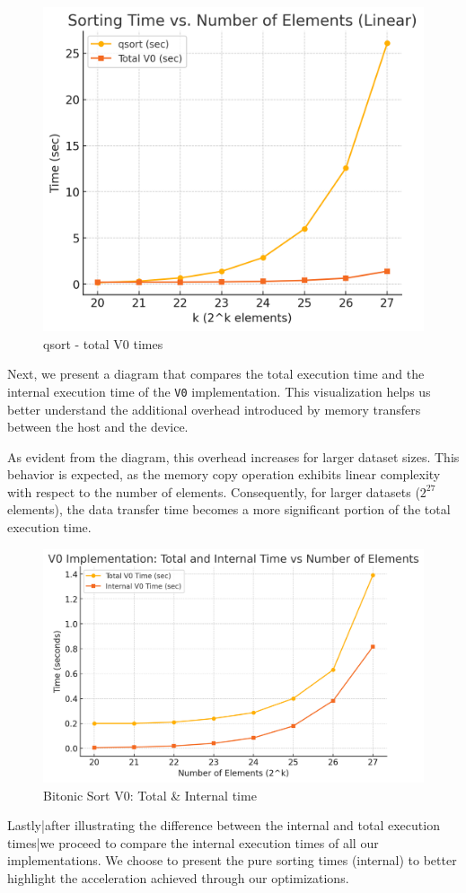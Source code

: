 \documentclass[12pt]{article}
\begin{document}
\begin{figure}[!h]
    \centering
    \includegraphics[width=0.5\linewidth]{plots/plot1_qsort_v0_times.png}
    \caption{qsort - total V0 times}
\end{figure}


Next, we present a diagram that compares the total execution time and the internal execution time of the \texttt{V0} implementation. This visualization helps us better understand the additional overhead introduced by memory transfers between the host and the device.

As evident from the diagram, this overhead increases for larger dataset sizes. This behavior is expected, as the memory copy operation exhibits linear complexity with respect to the number of elements. Consequently, for larger datasets (\( 2^{27} \) elements), the data transfer time becomes a more significant portion of the total execution time.

\begin{figure}[!h]
    \centering
    \includegraphics[width=0.65\linewidth]{plots/plot2_v0_total_and_internal.png}
    \caption{Bitonic Sort V0: Total \& Internal time}
\end{figure}


Lastly|after illustrating the difference between the internal and total execution times|we proceed to compare the internal execution times of all our implementations. We choose to present the pure sorting times (internal) to better highlight the acceleration achieved through our optimizations.
\end{document}
